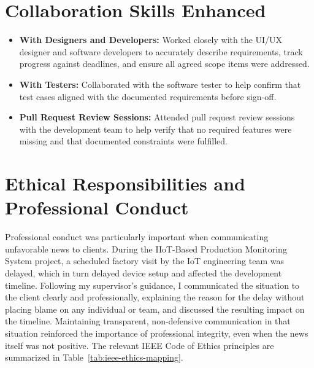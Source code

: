 \section{Collaboration Skills Enhanced}
\begin{itemize}
    \item \textbf{With Designers and Developers:} Worked closely with the UI/UX designer and software developers to accurately describe requirements, track progress against deadlines, and ensure all agreed scope items were addressed.
    \item \textbf{With Testers:} Collaborated with the software tester to help confirm that test cases aligned with the documented requirements before sign-off.
    \item \textbf{Pull Request Review Sessions:} Attended pull request review sessions with the development team to help verify that no required features were missing and that documented constraints were fulfilled.
\end{itemize}

\section{Ethical Responsibilities and Professional Conduct}
\par Professional conduct was particularly important when communicating unfavorable news to clients. During the IIoT-Based Production Monitoring System project, a scheduled factory visit by the IoT engineering team was delayed, which in turn delayed device setup and affected the development timeline. Following my supervisor's guidance, I communicated the situation to the client clearly and professionally, explaining the reason for the delay without placing blame on any individual or team, and discussed the resulting impact on the timeline. Maintaining transparent, non-defensive communication in that situation reinforced the importance of professional integrity, even when the news itself was not positive. The relevant IEEE Code of Ethics principles are summarized in Table~\ref{tab:ieee-ethics-mapping}.

